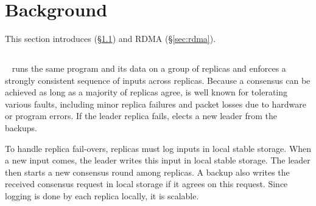 \section{Background}\label{sec:background}

This section introduces \paxos
(\S\ref{sec:paxos}) and RDMA (\S\ref{sec:rdma}).

\subsection{\paxos}\label{sec:paxos}
\paxos~\cite{paxos:complex,paxos,paxos:simple,paxos:live,paxos:fast,
paxos:practical} runs the same program and its data on a group of replicas 
and enforces a strongly consistent sequence of inputs across replicas. Because 
a consensus can be achieved as long as a majority of replicas agree, \paxos is 
well known for tolerating various faults, including minor replica failures 
and packet losses due to hardware or program errors. If the leader replica
fails, \paxos elects a new leader from the backups.

To handle replica fail-overs, \paxos replicas must log inputs in local 
stable storage. When a new input comes, the \paxos leader writes this input in 
local stable storage. The leader then starts a new consensus round among 
replicas. A backup also writes the received consensus request in local storage 
if it agrees on this request. Since logging is done by each replica locally, it 
is scalable.



